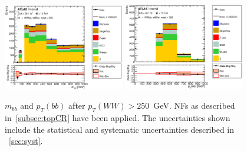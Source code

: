 \begin{figure}[!h]
\begin{center}
\includegraphics*[width=0.47\textwidth] {figures/ControlPlots/reOpt2000/C_mBBcr_reOpt2000_bbpt350_wwpt250_bbMass_regionA_met25d020.eps}
\includegraphics*[width=0.47\textwidth] {figures/ControlPlots/reOpt2000/C_mBBcr_reOpt2000_bbpt350_wwpt250_bbPt_regionA_met25d020.eps}
\caption[$m_{bb}$ and  $p_{T}(bb)$ after $p_{T}(WW) > 250$~GeV.]{$m_{bb}$ and  $p_{T}(bb)$ after $p_{T}(WW) > 250$~GeV.  \ttbar NFs as described in~\ref{subsec:topCR} have been applied. The uncertainties shown include the statistical and systematic uncertainties described in ~\ref{sec:syst}.}
\end{center}
\end{figure}

